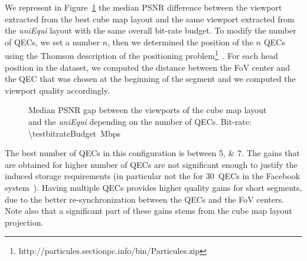 We represent in Figure~\ref{fig:QEC} the median \ac{PSNR} difference
between the viewport extracted from the best cube map layout and the
same viewport extracted from the \emph{uniEqui} layout with the same
overall bit-rate budget. To modify the number of \acp{QEC}, we set a
number $n$, then we determined the position of the $n$ \acp{QEC} using the Thomson description of the positioning problem\footnote{http://particules.sectionpc.info/bin/Particules.zip}~\cite{rakhmanov1994electrons}.
For each head position in the dataset, we computed the distance
between the \ac{FoV} center and the \ac{QEC} that was chosen at the
beginning of the segment and we computed the viewport quality
accordingly.
%
%


\begin{figure}
\centering

\caption{Median \acs{PSNR} gap between the viewports of the cube map layout and the \textit{uniEqui} depending
on the number of QECs.
Bit-rate: \SI{\testbitrateBudget}{\mega bps}}
\label{fig:QEC}
\end{figure}

The best number of \acp{QEC} in this configuration is between
\numlist{5;7}. The gains that are obtained for higher number of
\acp{QEC} are not significant enough to justify the induced storage
requirements (in particular not the for $30$~\acp{QEC} in the Facebook
system~\cite{facebook}). Having multiple  \acp{QEC} provides higher
quality gains for short segments, due to the better re-synchronization
between the \acp{QEC} and the \ac{FoV} centers. Note also that a
significant part of these gains stems from the cube map layout
projection.
%
